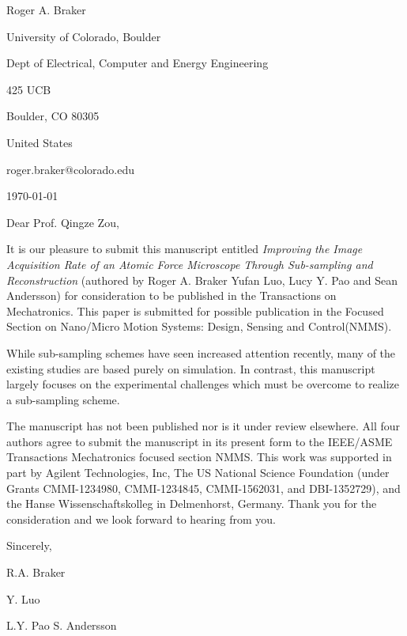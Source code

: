 \documentclass[a4paper,twoside]{article}
\begin{document}
\hspace*{0.45\linewidth}
\begin{minipage}{0.52\linewidth}
Roger A. Braker\par
University of Colorado, Boulder\par
Dept of Electrical, Computer and Energy Engineering \par
425 UCB\par
Boulder, CO 80305\par
United States\par
roger.braker@colorado.edu\par
\today
\end{minipage}
\par\bigskip

Dear Prof. Qingze Zou,\par\bigskip

It is our pleasure to submit this manuscript entitled \textit{Improving the Image Acquisition Rate of an Atomic Force Microscope Through Sub-sampling and Reconstruction} (authored by Roger A. Braker Yufan Luo, Lucy Y. Pao and Sean Andersson) for consideration to be published in the Transactions on Mechatronics. This paper is submitted for possible publication in the Focused Section on Nano/Micro 
Motion  Systems:  Design,  Sensing  and  Control(NMMS).


While sub-sampling schemes have seen increased attention recently, many of the existing studies are based purely on simulation. In contrast, this manuscript largely focuses on the experimental challenges which must be overcome to realize a sub-sampling scheme. 

The manuscript has not been published nor is it under review elsewhere. All four authors agree to submit the manuscript in its present form to the IEEE/ASME Transactions Mechatronics focused section NMMS. This work was supported in part by Agilent Technologies, Inc, The US National Science Foundation (under Grants CMMI-1234980, CMMI-1234845, CMMI-1562031, and DBI-1352729), and the Hanse Wissenschaftskolleg in Delmenhorst, Germany. Thank you for the consideration and we look forward to hearing from you.

\par\bigskip
\noindent Sincerely,
\par\bigskip
\noindent R.A. Braker\par
\noindent Y. Luo\par
\noindent L.Y. Pao
\noindent S. Andersson
\end{document}
